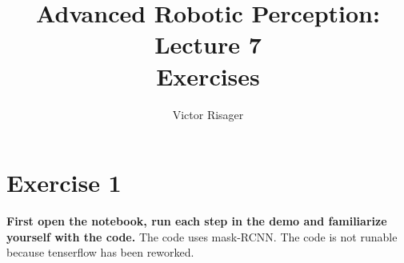 \documentclass[a4paper]{article}
\title{Advanced Robotic Perception: Lecture 7 \\
	\large Exercises}
\author{Victor Risager}
\begin{document}
\maketitle
\section{Exercise 1}
\textbf{First open the notebook, run each step in the demo and familiarize yourself with the code.} 
The code uses mask-RCNN. 
The code is not runable because tenserflow has been reworked.
\end{document}
